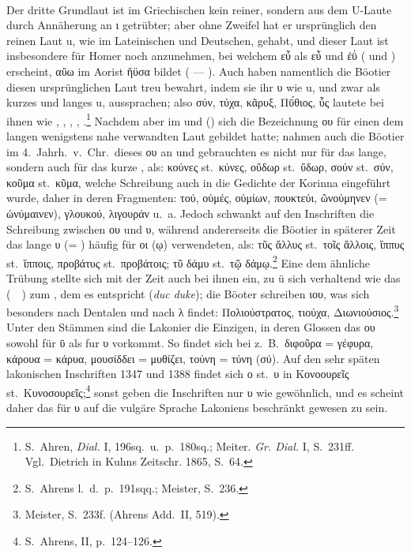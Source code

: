 \paragraph{} Der dritte Grundlaut ist im Griechischen kein reiner, sondern aus
dem U-Laute durch Annäherung an ι getrübter; aber ohne Zweifel hat er
ursprünglich den reinen Laut u, wie im Lateinischen und Deutschen, gehabt, und
dieser Laut ist insbesondere für Homer noch anzunehmen, bei welchem εὖ als εὖ
und ἐΰ ( und ) erscheint, αὔω im Aorist ἤϋσα bildet ( — ). Auch
haben namentlich die Böotier diesen ursprünglichen Laut treu bewahrt, indem sie
ihr υ wie u, und zwar als kurzes und langes u, aussprachen; also σύν, τύχα,
κᾶρυξ, Πῡ́θιος, ὗς lautete bei ihnen wie , , ,
,
.\footnote{S.\ Ahren, \emph{Dial.} I, 196sq.\ u.\ p.\ 180sq.; Meiter.
	\emph{Gr. Dial.} I, S.\ 231ff. Vgl.\ Dietrich in Kuhns Zeitschr. 1865, S.\ 64.}
Nachdem aber im  und 
() sich die Bezeichnung ου für
einen dem langen  wenigstens nahe verwandten Laut gebildet hatte; nahmen auch
die Böotier im 4.\ Jahrh.~v.~Chr.\ dieses ου an und gebrauchten es nicht nur für
das lange, sondern auch für das kurze , als: κούνες st.\ κύνες, οὔδωρ
st.\ ὕδωρ,
σούν st.\ σύν, κοῦμα st.\ κῦμα, welche Schreibung auch in die Gedichte der
Korinna eingeführt wurde, daher in deren Fragmenten: τού, οὐμές, οὐμίων,
πουκτεύι, ῶνούμηνεν (= ὠνύμαινεν), γλουκού, λιγουράν u.~a.
Jedoch schwankt auf den
 Inschriften die Schreibung zwischen ου und υ, während andererseits
die Böotier in späterer Zeit das lange υ (= ) häufig für οι (ῳ)
verwendeten, als: τῦς ἄλλυς st.\ τοῖς ἄλλοις, ἵππυς st.\ ἵπποις, προβάτυς st.\
προβάτοις; τῦ δάμυ st.\ τῷ δάμῳ.\footnote{S.\ Ahrens l.\ d.\ p.\ 191sqq.;
	Meister, S.\ 236.}
Eine dem  ähnliche Trübung stellte sich mit der Zeit auch bei ihnen ein, zu ü
sich verhaltend wie das \langlongdecl{engl}{e} \ipa{ū} (~\ipa{i͜u}~) zum
\langlongdecl{franz}{en} \ipa{u}, dem es entspricht
(\emph{duc}  \emph{duke}); die Böoter schreiben ιου, was sich besonders nach Dentalen und
nach λ findet: Πολιούστρατος, τιούχα, Διωνιούσιος.\footnote{Meister, S.\ 233f.
	(Ahrens Add.\ II, 519).}
Unter den  Stämmen sind die Lakonier die Einzigen, in deren Glossen das
ου sowohl für ῡ als fur υ vorkommt.
So findet sich bei  z.~B.\ διφοῦρα =
γέφυρα, κάρουα = κάρυα, μουσίδδει = μυθίζει, τούνη = τύνη (σύ). Auf den sehr
späten lakonischen Inschriften 1347 und 1388 findet sich ο st.\ υ in Κονοουρεῖς
st.\ Κυνοσουρεῖς;\footnote{S.\ Ahrens, II, p.\ 124--126.}
sonst geben die Inschriften nur υ wie gewöhnlich, und es scheint daher das  für υ auf die vulgäre Sprache Lakoniens beschränkt gewesen zu sein.

